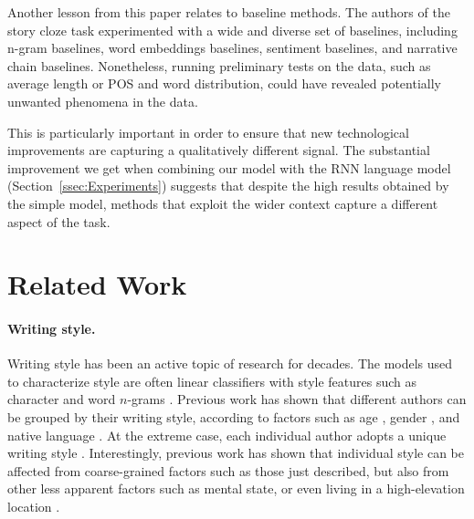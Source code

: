 \documentclass[11pt,a4paper]{article}
\newcommand{\secref}[1]{Section~\ref{ssec:#1}}
\newcommand{\isection}[2]{\section{#1}\label{ssec:#2}}
\newcommand{\resolved}[1]{}
\newcommand{\roy}[1]{{\color{orange}\textsc{[#1 --rs]}}}
\newcommand{\nascomment}[1]{{\color{blue}\textsc{[#1 --nas]}}}
\renewcommand{\roy}[1]{}
\begin{document}
Another lesson from this paper relates to baseline methods. 
The authors of the story cloze task experimented with a wide and diverse set of baselines, including n-gram baselines, word embeddings baselines, sentiment baselines, and narrative chain baselines. 
Nonetheless, running preliminary tests on the data, such as average length or  POS and word distribution,  could have revealed potentially unwanted phenomena in the data.
\resolved{\nascomment{this paragraph needs extra care.  the authors of the ROC
  paper did try to control for a lot of things and they did run
  baselines.  we ought to be generous and reiterate that here.  what,
  precisely, did they miss?  the lesson isn't just ``run more controls
  and baselines'' is it?}
First, it stresses the need to carefully control for even seemingly minor details. 
Second, it emphasizes the importance of running baseline models.
While recent advances in NLP  suggest that many classic NLP methods are out-of-date, 
this is not necessarily the case, especially for small
datasets. \nascomment{ this bit about simple models feels like a red herring}}
This is particularly important in order to ensure that  new technological improvements are capturing a qualitatively different signal.
The substantial improvement we get when combining our model
with the RNN language model (\secref{Experiments}) suggests that
despite the high results obtained by the simple model, 
methods that exploit the wider context  capture a different aspect of the
task. \resolved{\nascomment{I like ending on this happier note, but let's not
  call it ``luck'' and let's focus on the task and representations,
  not the ML methods, which are probably not the heart of the difference}}
  \roy{Modified this to be more concrete. Did end up hinting that they should have done a better job at analyzing their data before publishing. Feel free to tone down.}

\isection{Related Work}{Related}

\paragraph{Writing style.}
Writing style has been an active topic of research for decades. 
The models used to characterize style are often linear classifiers with style features such as character and word $n$-grams \cite{Stamatatos:2009,Koppel:2009}.
Previous work has shown that different authors can be grouped by their
writing style, according to factors such as age
\cite{Pennebaker:2003,Argamon:2003,Schler:2006,Rosenthal:2011,nguyen:2011:latech},
gender \cite{Argamon:2003,Schler:2006,bamman2014gender}, and native language
\cite{Koppel:2005,Tsur:2007,Bergsma:2012}.   \resolved{\nascomment{cite generously here, it costs us nothing}}
At the extreme case, each individual author adopts a unique writing
style \cite{mosteller1963inference,pennebaker1999linguistic,Schwartz:2013}. 
Interestingly, previous work has shown that individual style can be affected from coarse-grained factors such as those just described, but also from other less apparent factors such as mental state, or even living in a high-elevation location \cite{schwartz2013personality}.
\end{document}
